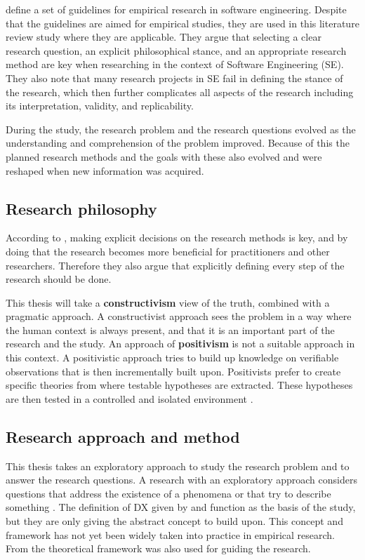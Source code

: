 \documentclass[english, 12pt, a4paper, sci, utf8, a-1b, online]{aaltothesis}
\begin{document}
\textcite{easterbrook2008selecting} define a set of guidelines for empirical research in software engineering. Despite that the guidelines are aimed for empirical studies, they are used in this literature review study where they are applicable. They argue that selecting a clear research question, an explicit philosophical stance, and an appropriate research method are key when researching in the context of Software Engineering (SE). They also note that many research projects in SE fail in defining the stance of the research, which then further complicates all aspects of the research including its interpretation, validity, and replicability.

During the study, the research problem and the research questions evolved as the understanding and comprehension of the problem improved. Because of this the planned research methods and the goals with these also evolved and were reshaped when new information was acquired.

\subsection{Research philosophy} \label{section:research-philosophy}

According to \textcite{easterbrook2008selecting}, making explicit decisions on the research methods is key, and by doing that the research becomes more beneficial for practitioners and other researchers. Therefore they also argue that explicitly defining every step of the research should be done.

This thesis will take a \textbf{constructivism} view of the truth, combined with a pragmatic approach. A constructivist approach sees the problem in a way where the human context is always present, and that it is an important part of the research and the study. An approach of \textbf{positivism} is not a suitable approach in this context. A positivistic approach tries to build up knowledge on verifiable observations that is then incrementally built upon. Positivists prefer to create specific theories from where testable hypotheses are extracted. These hypotheses are then tested in a controlled and isolated environment \parencite{easterbrook2008selecting}.

\subsection{Research approach and method}

This thesis takes an exploratory approach to study the research problem and to answer the research questions. A research with an exploratory approach considers questions that address the existence of a phenomena or that try to describe something \parencite{easterbrook2008selecting}. The definition of DX given by \textcite{fagerholm-dx-concept-and-definition} and \textcite{fagerholm-doctoral-thesis} function as the basis of the study, but they are only giving the abstract concept to build upon. This concept and framework has not yet been widely taken into practice in empirical research. From \textcite{fagerholm-doctoral-thesis} the theoretical framework was also used for guiding the research.
\end{document}
